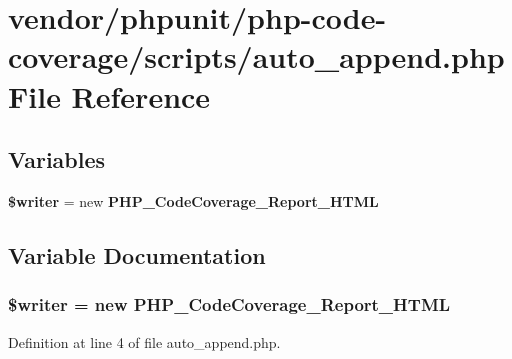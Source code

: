 \section{vendor/phpunit/php-\/code-\/coverage/scripts/auto\+\_\+append.php File Reference}
\label{auto__append_8php}
\subsection*{Variables}
\begin{DoxyCompactItemize}
\item 
{\bf \$writer} = new {\bf P\+H\+P\+\_\+\+Code\+Coverage\+\_\+\+Report\+\_\+\+H\+T\+M\+L}
\end{DoxyCompactItemize}


\subsection{Variable Documentation}
\subsubsection[{\$writer}]{\setlength{\rightskip}{0pt plus 5cm}\$writer = new {\bf P\+H\+P\+\_\+\+Code\+Coverage\+\_\+\+Report\+\_\+\+H\+T\+M\+L}}\label{auto__append_8php_aedb5d76609590564ac84c9b31f327199}


Definition at line 4 of file auto\+\_\+append.\+php.

